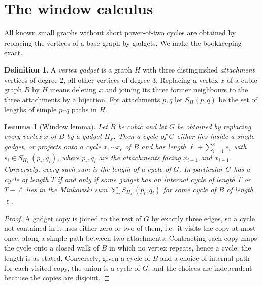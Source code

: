 \documentclass[11pt]{article}
\newtheorem{lemma}[theorem]{Lemma}
\theoremstyle{remark}
\theoremstyle{definition}
\newtheorem{definition}[theorem]{Definition}
\begin{document}
\section{The window calculus}\label{sec:window}

All known small graphs without short power-of-two cycles are obtained by replacing the vertices of a base graph by gadgets. We make the bookkeeping exact.

\begin{definition}
A \emph{vertex gadget} is a graph $H$ with three distinguished \emph{attachment} vertices of degree 2, all other vertices of degree 3. Replacing a vertex $x$ of a cubic graph $B$ by $H$ means deleting $x$ and joining its three former neighbours to the three attachments by a bijection. For attachments $p,q$ let $S_H(p,q)$ be the set of lengths of simple $p$--$q$ paths in $H$.
\end{definition}

\begin{lemma}[Window lemma]\label{lem:window}
Let $B$ be cubic and let $G$ be obtained by replacing every vertex $x$ of $B$ by a gadget $H_x$. Then a cycle of $G$ either lies inside a single gadget, or projects onto a cycle $x_1\cdots x_\ell$ of $B$ and has length $\ell+\sum_{i=1}^{\ell}s_i$ with $s_i\in S_{H_{x_i}}(p_i,q_i)$, where $p_i,q_i$ are the attachments facing $x_{i-1}$ and $x_{i+1}$. Conversely, every such sum is the length of a cycle of $G$. In particular $G$ has a cycle of length $T$ if and only if some gadget has an internal cycle of length $T$ or $T-\ell$ lies in the Minkowski sum $\sum_i S_{H_{x_i}}(p_i,q_i)$ for some cycle of $B$ of length $\ell$.
\end{lemma}

\begin{proof}
A gadget copy is joined to the rest of $G$ by exactly three edges, so a cycle not contained in it uses either zero or two of them, i.e.\ it visits the copy at most once, along a simple path between two attachments. Contracting each copy maps the cycle onto a closed walk of $B$ in which no vertex repeats, hence a cycle; the length is as stated. Conversely, given a cycle of $B$ and a choice of internal path for each visited copy, the union is a cycle of $G$, and the choices are independent because the copies are disjoint.
\end{proof}
\end{document}
